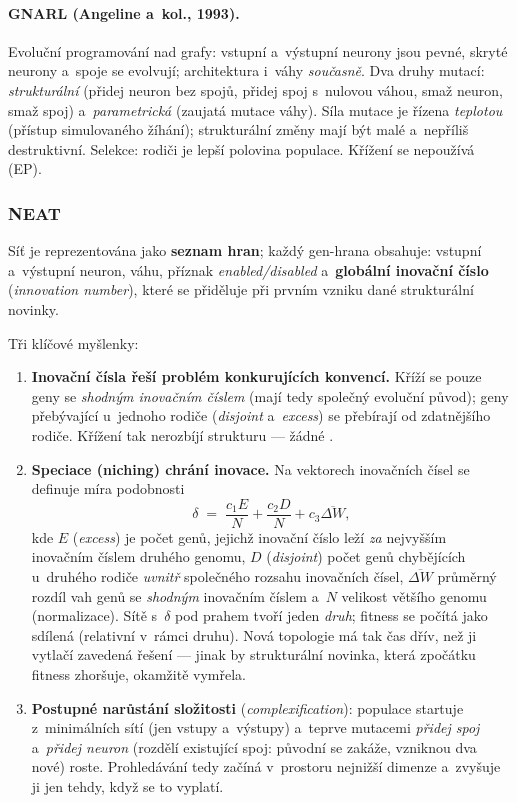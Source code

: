 \documentclass[11pt,a4paper]{article}
\theoremstyle{definition}
\begin{document}
\paragraph{GNARL (Angeline a~kol., 1993).} Evoluční programování nad grafy:
vstupní a~výstupní neurony jsou pevné, skryté neurony a~spoje se evolvují;
architektura i~váhy \emph{současně}. Dva druhy mutací: \emph{strukturální}
(přidej neuron bez spojů, přidej spoj s~nulovou váhou, smaž neuron, smaž spoj)
a~\emph{parametrická} (zaujatá mutace váhy). Síla mutace je řízena
\emph{teplotou} (přístup simulovaného žíhání); strukturální změny mají být
malé a~nepříliš destruktivní. Selekce: rodiči je lepší polovina populace.
Křížení se nepoužívá (EP).

\subsubsection{NEAT}

\begin{defbox}
Síť je reprezentována jako \textbf{seznam hran}; každý gen-hrana obsahuje:
vstupní a~výstupní neuron, váhu, příznak \emph{enabled/disabled}
a~\textbf{globální inovační číslo} (\emph{innovation number}), které se
přiděluje při prvním vzniku dané strukturální novinky.
\end{defbox}

Tři klíčové myšlenky:
\begin{enumerate}
\item \textbf{Inovační čísla řeší problém konkurujících konvencí.}
  Kříží se pouze geny se \emph{shodným inovačním číslem} (mají tedy společný
  evoluční původ); geny přebývající u~jednoho rodiče
  (\emph{disjoint} a~\emph{excess}) se přebírají od zdatnějšího rodiče.
  Křížení tak nerozbíjí strukturu --- žádné .
\item \textbf{Speciace (niching) chrání inovace.} Na vektorech inovačních
  čísel se definuje míra podobnosti
  \[
  \delta \;=\; \frac{c_1 E}{N} + \frac{c_2 D}{N} + c_3 \overline{\Delta W},
  \]
  kde $E$ (\emph{excess}) je počet genů, jejichž inovační číslo leží
  \emph{za} nejvyšším inovačním číslem druhého genomu, $D$ (\emph{disjoint})
  počet genů chybějících u~druhého rodiče \emph{uvnitř} společného rozsahu
  inovačních čísel, $\overline{\Delta W}$ průměrný rozdíl vah genů se
  \emph{shodným} inovačním číslem a~$N$ velikost většího genomu (normalizace). Sítě s~$\delta$ pod prahem tvoří jeden \emph{druh};
  fitness se počítá jako sdílená (relativní v~rámci druhu). Nová topologie
  má tak čas  dřív, než ji vytlačí zavedená řešení ---
  jinak by strukturální novinka, která zpočátku fitness zhoršuje, okamžitě
  vymřela.
\item \textbf{Postupné narůstání složitosti} (\emph{complexification}):
  populace startuje z~minimálních sítí (jen vstupy a~výstupy) a~teprve
  mutacemi \emph{přidej spoj} a~\emph{přidej neuron} (rozdělí existující spoj:
  původní se zakáže, vzniknou dva nové) roste. Prohledávání tedy začíná
  v~prostoru nejnižší dimenze a~zvyšuje ji jen tehdy, když se to vyplatí.
\end{enumerate}
\end{document}
